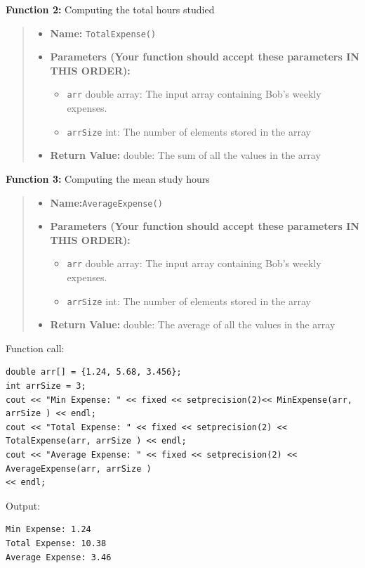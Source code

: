 \textbf{Function 2:} Computing the total hours studied
\begin{quote}
\begin{itemize}
    \item \textbf{Name:} \texttt{TotalExpense()}
    \item \textbf{Parameters (Your function should accept these parameters IN THIS ORDER):}
        \begin{itemize}
            \item \texttt{arr} double array: The input array containing Bob's weekly expenses.
            \item \texttt{arrSize} int: The number of elements stored in the array
        \end{itemize}
        
    \item \textbf{Return Value:} double: The sum of all the values in the array
\end{itemize}
\end{quote}


\textbf{Function 3:} Computing the mean study hours
\begin{quote}
\begin{itemize}
    \item \textbf{Name:}\texttt {AverageExpense()}
    \item \textbf{Parameters (Your function should accept these parameters IN THIS ORDER):}
    \begin{itemize}
        \item \texttt{arr} double array: The input array containing Bob's weekly expenses.
        \item \texttt{arrSize} int: The number of elements stored in the array
    \end{itemize}
    \item \textbf{Return Value:} double: The average of all the values in the array

\end{itemize}
\end{quote}

\begin{example}
    Function call:

\begin{verbatim}
double arr[] = {1.24, 5.68, 3.456};
int arrSize = 3;
cout << "Min Expense: " << fixed << setprecision(2)<< MinExpense(arr, arrSize ) << endl;
cout << "Total Expense: " << fixed << setprecision(2) << TotalExpense(arr, arrSize ) << endl;
cout << "Average Expense: " << fixed << setprecision(2) << AverageExpense(arr, arrSize )
<< endl;
\end{verbatim}
    Output:

\begin{verbatim}
Min Expense: 1.24
Total Expense: 10.38
Average Expense: 3.46
\end{verbatim}
\end{example}

